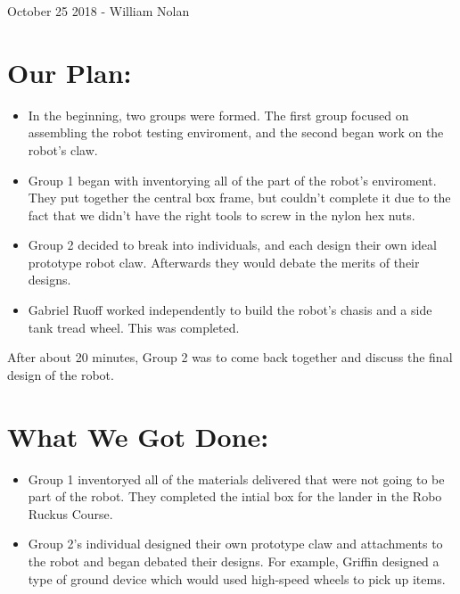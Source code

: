 \documentclass[12pt]{article}
\begin{document}
October 25 2018 - William Nolan

\section{Our Plan:} %
\begin{itemize}
    \item In the beginning, two groups were formed.  The first group focused on assembling the robot testing enviroment, and the second began work on the robot's claw.
    \item Group 1 began with inventorying all of the part of the robot's enviroment.  They put together the central box frame, but couldn't complete it due to the fact that we didn't have the right tools to screw in the nylon hex nuts.
    \item Group 2 decided to break into individuals, and each design their own ideal prototype robot claw. Afterwards they would debate the merits of their designs.
    \item Gabriel Ruoff worked independently to build the robot's chasis and a side tank tread wheel. This was completed.
\end{itemize}

After about 20 minutes, Group 2 was to come back together and discuss the final design of the robot.

\section{What We Got Done:} %
\begin{itemize}
    \item Group 1 inventoryed all of the materials delivered that were not going to be part of the robot. They completed the intial box for the lander in the Robo Ruckus Course.
    \item Group 2's individual designed their own prototype claw and attachments to the robot and began debated their designs.  For example, Griffin designed a type of ground device which would used high-speed wheels to pick up items.
\end{itemize}
\end{document}
